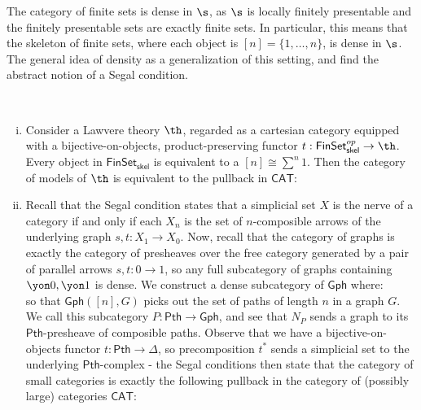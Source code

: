 The category of finite sets is dense in $\s$, as $\s$ is locally finitely presentable and the finitely presentable sets are exactly finite sets. In particular, this means that the skeleton of finite sets, where each object is $[n] = \{1, \dots, n\}$, is dense in $\s$. The general idea of density as a generalization of this setting, and find the abstract notion of a Segal condition.
\begin{example}
    ~\begin{enumerate}[(i)]
        \item Consider a Lawvere theory $\th$, regarded as a cartesian category equipped with a bijective-on-objects, product-preserving functor $t:\mathsf{FinSet}_{\mathsf{skel}}^{op} \to \th$. Every object in $\mathsf{FinSet}_{\mathsf{skel}}$ is equivalent to a $[n] \cong \sum^n 1$. Then the category of models of $\th$ is equivalent to the pullback in $\mathsf{CAT}$:
        \[\]
        \item Recall that the Segal condition states that a simplicial set $X$ is the nerve of a category if and only if each $X_n$ is the set of $n$-composible arrows of the underlying graph $s,t:X_1 \to X_0$. Now, recall that the category of graphs is exactly the category of presheaves over the free category generated by a pair of parallel arrows $s,t: 0 \to 1$, so any full subcategory of graphs containing $\yon 0, \yon 1$ is dense. We construct a dense subcategory of $\mathsf{Gph}$ where:
       \[ \]
        so that $\mathsf{Gph}([n],G)$ picks out the set of paths of length $n$ in a graph $G$. We call this subcategory $P:\mathsf{Pth} \to \mathsf{Gph}$, and see that $N_P$ sends a graph to its $\mathsf{Pth}$-presheave of composible paths.
        Observe that we have a bijective-on-objects functor $t:\mathsf{Pth} \to \Delta$, so precomposition $t^*$ sends a simplicial set to the underlying $\mathsf{Pth}$-complex - the Segal conditions then state that the category of small categories is exactly the following pullback in the category of (possibly large) categories $\mathsf{CAT}$:
        \[\]
    \end{enumerate}
\end{example}


